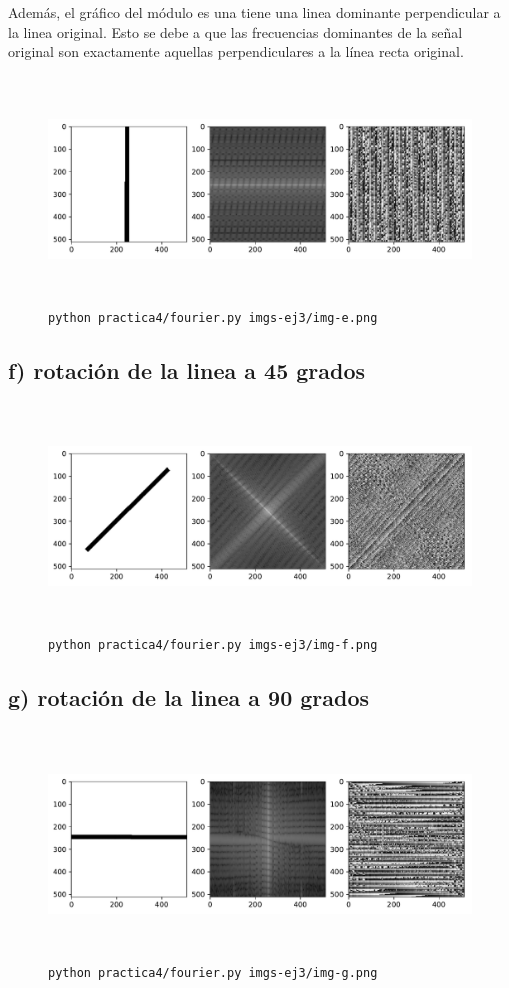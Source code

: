 \documentclass[11pt, spanish]{article}
\begin{document}
Además, el gráfico del módulo es una tiene una linea dominante perpendicular a la linea original. Esto se debe a que las
frecuencias dominantes de la señal original son exactamente aquellas perpendiculares a la línea recta original.
\begin{figure}[H]
\centering
  \includegraphics[height=6cm]{informe-imgs/ej3-e.pdf}
  \caption{\texttt{python practica4/fourier.py imgs-ej3/img-e.png}}
\end{figure}

\subsection{f) rotación de la linea a 45 grados}
\begin{figure}[H]
\centering
  \includegraphics[height=6cm]{informe-imgs/ej3-f.pdf}
  \caption{\texttt{python practica4/fourier.py imgs-ej3/img-f.png}}
\end{figure}

\subsection{g) rotación de la linea a 90 grados}
\begin{figure}[H]
\centering
  \includegraphics[height=6cm]{informe-imgs/ej3-g.pdf}
  \caption{\texttt{python practica4/fourier.py imgs-ej3/img-g.png}}
\end{figure}
\end{document}

